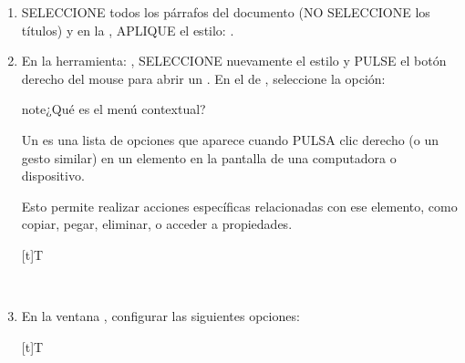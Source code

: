 \documentclass[letterpaper,10pt,spanish]{sphinxmanual}
\let\sphinxpxdimen\pdfpxdimen\else\newdimen\sphinxpxdimen
\begin{document}
\begin{enumerate}
\item {} 
\sphinxAtStartPar
SELECCIONE todos los párrafos del documento (NO SELECCIONE los títulos) y en la , APLIQUE el estilo: .

\item {} 
\sphinxAtStartPar
En la herramienta: , SELECCIONE nuevamente el estilo  y PULSE el botón derecho del mouse para abrir un . En el  de , seleccione la opción: 

\begin{sphinxadmonition}{note}{¿Qué es el menú contextual?}

\sphinxAtStartPar
Un  es una lista de opciones que aparece cuando PULSA clic derecho (o un gesto similar) en un elemento en la pantalla de una computadora o dispositivo.

\sphinxAtStartPar
Esto permite realizar acciones específicas relacionadas con ese elemento, como copiar, pegar, eliminar, o acceder a propiedades.
\end{sphinxadmonition}


\begin{savenotes}\sphinxattablestart
\sphinxthistablewithglobalstyle
\centering
\begin{tabulary}{\linewidth}[t]{T}
\sphinxtoprule
\sphinxtableatstartofbodyhook

\begin{sphinxfigure-in-table}
\centering

\noindent\sphinxincludegraphics[width=250\sphinxpxdimen]{{image22}.png}
\end{sphinxfigure-in-table}\relax
\\
\sphinxbottomrule
\end{tabulary}
\sphinxtableafterendhook\par
\sphinxattableend\end{savenotes}

\item {} 
\sphinxAtStartPar
En la ventana , configurar las siguientes opciones:


\begin{savenotes}\sphinxattablestart
\sphinxthistablewithglobalstyle
\centering
\begin{tabulary}{\linewidth}[t]{T}
\sphinxtoprule
\sphinxtableatstartofbodyhook


\end{tabulary}
\end{savenotes}
\end{enumerate}
\end{document}
